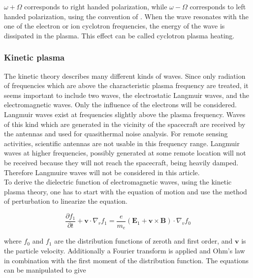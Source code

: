 \documentclass[a4paper,11pt]{article}
\begin{document}
$\omega+\Omega$ corresponds to right handed polarization, while $\omega-\Omega$ corresponds to left handed polarization, using the convention of \cite{stix}. When the wave resonates with the one of the electron or ion cyclotron frequencies, the energy of the wave is dissipated in the plasma. This effect can be called cyclotron plasma heating.


\subsubsection{Kinetic plasma}\label{sec_isotropic_kinetic_permittivity}
The kinetic theory describes many different kinds of waves. Since only radiation of frequencies which are above the characteristic plasma frequency are treated, it seems important to include two waves, the electrostatic Langmuir waves, and the electromagnetic waves. Only the influence of
the electrons will be considered.\\

Langmuir waves exist at frequencies slightly above the plasma frequency. Waves of this kind which are generated in the vicinity of the spacecraft are received by the antennas and used for quasithermal noise analysis. For remote sensing activities, scientific antennas are not usable in this frequency range. Langmuir waves at higher frequencies, possibly generated at some remote location will not be received because they will not reach the spacecraft, being heavily damped. Therefore Langmuire waves will not be considered in this article.\\

To derive the dielectric function of electromagnetic waves, using the kinetic plasma theory, one has to start with the equation of motion and use the method of perturbation to linearize the equation.

\begin{equation}\label{eq:vlasov_full_linearized}
\frac{\partial f_1}{\partial t} + \mathbf{v}\cdot
\nabla_r f_1=\frac{e}{m_e}\left( \mathbf{E}_1+\mathbf{v} \times \mathbf{B}\right) \cdot \nabla_v f_0
\end{equation}

where $f_0$ and $f_1$ are the distribution functions of zeroth and first order, and $\mathbf{v}$ is the particle velocity. Additionally a Fourier transform is applied and Ohm's law in combination with the first moment of the distribution function. The equations can be manipulated to give
\end{document}
